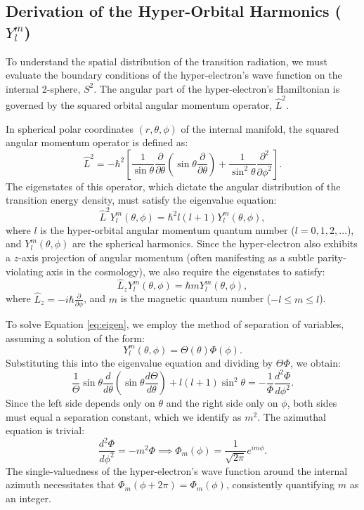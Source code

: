 \subsection{Derivation of the Hyper-Orbital Harmonics ($Y_l^m$)}

To understand the spatial distribution of the transition radiation, we must evaluate the boundary conditions of the hyper-electron's wave function on the internal 2-sphere, $S^2$. The angular part of the hyper-electron's Hamiltonian is governed by the squared orbital angular momentum operator, $\hat{L}^2$. 

In spherical polar coordinates $(r, \theta, \phi)$ of the internal manifold, the squared angular momentum operator is defined as:
\begin{equation}
\hat{L}^2 = -\hbar^2 \left[ \frac{1}{\sin\theta} \frac{\partial}{\partial \theta} \left( \sin\theta \frac{\partial}{\partial \theta} \right) + \frac{1}{\sin^2\theta} \frac{\partial^2}{\partial \phi^2} \right].
\end{equation}
The eigenstates of this operator, which dictate the angular distribution of the transition energy density, must satisfy the eigenvalue equation:
\begin{equation}
\hat{L}^2 Y_l^m(\theta, \phi) = \hbar^2 l(l+1) Y_l^m(\theta, \phi), \label{eq:eigen}
\end{equation}
where $l$ is the hyper-orbital angular momentum quantum number ($l = 0, 1, 2, \dots$), and $Y_l^m(\theta, \phi)$ are the spherical harmonics. Since the hyper-electron also exhibits a $z$-axis projection of angular momentum (often manifesting as a subtle parity-violating axis in the cosmology), we also require the eigenstates to satisfy:
\begin{equation}
\hat{L}_z Y_l^m(\theta, \phi) = \hbar m Y_l^m(\theta, \phi),
\end{equation}
where $\hat{L}_z = -i\hbar \frac{\partial}{\partial \phi}$, and $m$ is the magnetic quantum number ($-l \le m \le l$).

To solve Equation \ref{eq:eigen}, we employ the method of separation of variables, assuming a solution of the form:
\begin{equation}
Y_l^m(\theta, \phi) = \Theta(\theta) \Phi(\phi).
\end{equation}
Substituting this into the eigenvalue equation and dividing by $\Theta \Phi$, we obtain:
\begin{equation}
\frac{1}{\Theta} \sin\theta \frac{d}{d\theta} \left( \sin\theta \frac{d\Theta}{d\theta} \right) + l(l+1)\sin^2\theta = -\frac{1}{\Phi} \frac{d^2\Phi}{d\phi^2}.
\end{equation}
Since the left side depends only on $\theta$ and the right side only on $\phi$, both sides must equal a separation constant, which we identify as $m^2$. The azimuthal equation is trivial:
\begin{equation}
\frac{d^2\Phi}{d\phi^2} = -m^2 \Phi \implies \Phi_m(\phi) = \frac{1}{\sqrt{2\pi}} e^{im\phi}.
\end{equation}
The single-valuedness of the hyper-electron's wave function around the internal azimuth necessitates that $\Phi_m(\phi + 2\pi) = \Phi_m(\phi)$, consistently quantifying $m$ as an integer.

